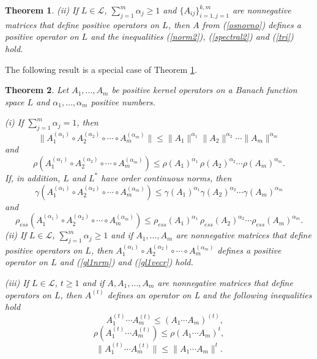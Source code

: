 \documentclass[12pt, reqno]{amsart}
\newtheorem{theorem}{Theorem}[section]
\theoremstyle{definition}
\theoremstyle{remark}
\numberwithin{equation}{section}
\newcommand{\be}{\begin{equation}}
\newcommand{\ee}{\end{equation}}
\begin{document}
\begin{theorem}
\noindent(ii) If $L\in\mathcal L$, $\sum_{j=1}^{m} \alpha _j\ge 1$ and $\{A_{i j}\}_{i=1, j=1}^{k, m}$ are nonnegative matrices that define positive operators on $L$, then $A$ from (\ref{osnovno}) defines a  positive operator on $L$ and the inequalities (\ref{norm2}), (\ref{spectral2}) and (\ref{tri}) hold.
\label{DBPfs}
\end{theorem}
The following result is a special case  of Theorem \ref{DBPfs}.
\begin{theorem}
\label{special_case}
Let $A_1 ,\ldots, A_m$ be positive kernel operators on a Banach function space  $L$
and $\alpha _1, \ldots, \alpha _m$ positive numbers. %

\noindent (i) If $\sum_{j=1}^m \alpha _j = 1$, then 
\be
 \|A_1 ^{( \alpha _1)} \circ A_2 ^{(\alpha _2)} \circ \cdots \circ A_m ^{(\alpha _m)} \| \le
  \|A_1\|^{ \alpha _1}  \|A_2\|^{\alpha _2} \cdots \|A_m\|^{\alpha _m}
\label{gl1nrm}
\ee
and
\be
 \rho(A_1 ^{( \alpha _1)} \circ A_2 ^{(\alpha _2)} \circ \cdots \circ A_m ^{(\alpha _m)} ) \le
\rho(A_1)^{ \alpha _1} \, \rho(A_2)^{\alpha _2} \cdots \rho(A_m)^{\alpha _m} .
\label{gl1vecr}
\ee
If, in addition, $L$ and $L^*$ have order continuous norms, then
\be
 \gamma (A_1 ^{( \alpha _1)} \circ A_2 ^{(\alpha _2)} \circ \cdots \circ A_m ^{(\alpha _m)} )\le
  \gamma(A_1)^{ \alpha _1}  \gamma(A_2)^{\alpha _2} \cdots \gamma(A_m)^{\alpha _m}
\label{gl1meas_nonc}
\ee
and
\be
 \rho _{ess}(A_1 ^{( \alpha _1)} \circ A_2 ^{(\alpha _2)} \circ \cdots \circ A_m ^{(\alpha _m)} ) \le
\rho _{ess }(A_1)^{ \alpha _1} \, \rho _{ess}(A_2)^{\alpha _2} \cdots \rho _{ess}(A_m)^{\alpha _m} .
\label{gl1vecress}
\ee
\noindent(ii) If $L\in\mathcal L$, $\sum_{j=1}^{m} \alpha _j\ge 1$ and if  $A_1 ,\ldots, A_m$ are nonnegative matrices that define positive operators on $L$, then $A_1 ^{( \alpha _1)} \circ A_2 ^{(\alpha _2)} \circ \cdots \circ A_m ^{(\alpha _m)}$ defines a positive operator on $L$ and (\ref{gl1nrm}) and (\ref{gl1vecr}) hold.

\noindent (iii)  If $L\in\mathcal L$, $t\ge1$ and if $A, A_1 ,\ldots, A_m$ are nonnegative matrices that define operators on $L$,    then $A^{(t)}$ %
 defines an  operator on L and the following inequalities hold
\be
\;\;\;\;\;A_1^{(t)}\cdots A_m^{(t)}\le(A_1\cdots A_m)^{(t)},
\label{gl1t}
\ee
\be
\rho(A_1^{(t)}\cdots A_m^{(t)})\le\rho(A_1\cdots A_m)^{t},
\label{gl1nt}
\ee
\be
\|A_1^{(t)}\cdots A_m^{(t)}\|\le\|A_1\cdots A_m\|^{t}.
\label{gl1vecrt}
\ee
\end{theorem}
\end{document}
